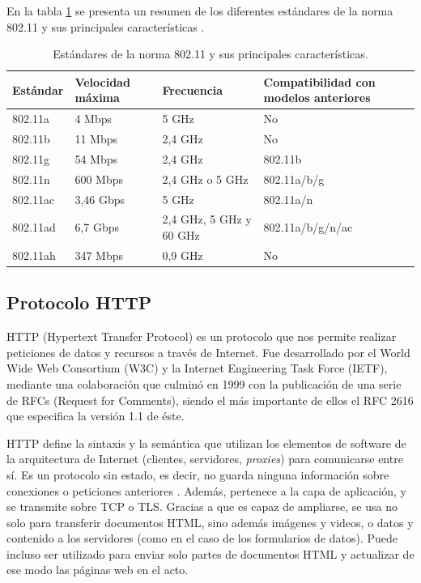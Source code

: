 En la tabla \ref{tab:protolocos80211} se presenta un resumen de los diferentes estándares de la norma 802.11 y sus principales características \citep{WEBSITE:80211}.

\begin{table}[h]
	\centering
	\caption[Protocolos 802.11]{Estándares de la norma 802.11 y sus principales características.}
	\begin{tabular}{p{2.5cm} p{3.5cm} p{3.5cm} p{3.5cm} } 	

		\toprule
		\textbf{Estándar} & 
		\textbf{Velocidad máxima} &
		\textbf{Frecuencia} &
		\textbf{Compatibilidad con modelos anteriores} 
		\\
		\midrule
802.11a & 4 Mbps & 5 GHz & No \\
802.11b & 11 Mbps & 2,4 GHz & No \\
802.11g & 54 Mbps & 2,4 GHz & 802.11b \\
802.11n & 600 Mbps & 2,4 GHz o 5 GHz & 802.11a/b/g \\
802.11ac & 3,46 Gbps & 5 GHz & 802.11a/n \\
802.11ad & 6,7 Gbps & 2,4 GHz, 5 GHz y 60 GHz & 802.11a/b/g/n/ac \\
802.11ah & 347 Mbps & 0,9 GHz & No \\
		\bottomrule
		\hline
	\end{tabular}
	\label{tab:protolocos80211}
\end{table}

\pagebreak
\subsection{Protocolo HTTP}

HTTP (Hypertext Transfer Protocol) es un protocolo que nos permite realizar peticiones de datos y recursos a través de Internet. Fue desarrollado por el World Wide Web Consortium (W3C) y la Internet Engineering Task Force (IETF), mediante una colaboración que culminó en 1999 con la publicación de una serie de RFCs (Request for Comments), siendo el más importante de ellos el RFC 2616 \citep{rfc2616} que especifica la versión 1.1 de éste. 

HTTP define la sintaxis y la semántica que utilizan los elementos de software de la arquitectura de Internet (clientes, servidores, \textit{proxies}) para comunicarse entre sí. Es un protocolo sin estado, es decir, no guarda ninguna información sobre conexiones o peticiones anteriores \citep{WEBSITE:HTTPWikipedia}. Además, pertenece a la capa de aplicación, y se transmite sobre TCP o TLS. Gracias a que es capaz de ampliarse, se usa no solo para transferir documentos HTML, sino además imágenes y videos, o datos y contenido a los servidores (como en el caso de los formularios de datos). Puede incluso ser utilizado para enviar solo partes de documentos HTML y actualizar de ese modo las páginas web en el acto.

